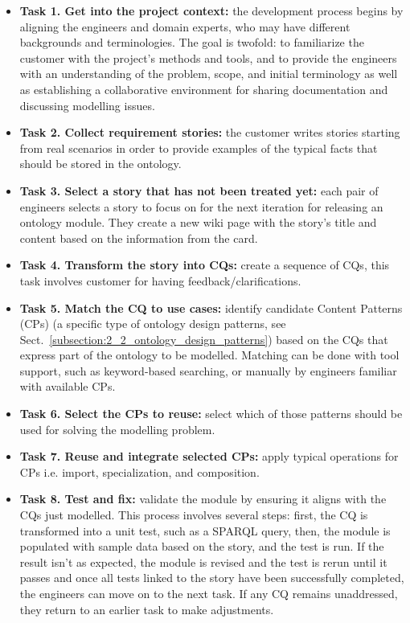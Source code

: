 \begin{itemize}
    \item \textbf{Task 1. Get into the project context:} the development process begins by aligning the engineers and domain experts, who may have different backgrounds and terminologies. The goal is twofold: to familiarize the customer with the project's methods and tools, and to provide the engineers with an understanding of the problem, scope, and initial terminology as well as establishing a collaborative environment for sharing documentation and discussing modelling issues.

    \item \textbf{Task 2. Collect requirement stories:} the customer writes stories starting from real scenarios in order to provide examples of the typical facts that should be stored in the ontology.

    \item \textbf{Task 3. Select a story that has not been treated yet:} each pair of engineers selects a story to focus on for the next iteration for releasing an ontology module. They create a new wiki page with the story's title and content based on the information from the card.

    \item \textbf{Task 4. Transform the story into CQs:} create a sequence of CQs, this task involves customer for having feedback/clarifications.

    \item \textbf{Task 5. Match the CQ to use cases:} identify candidate Content Patterns (CPs) (a specific type of ontology design patterns, see Sect.~\ref{subsection:2_2_ontology_design_patterns}) based on the CQs that express part of the ontology to be modelled. Matching can be done with tool support, such as keyword-based searching, or manually by engineers familiar with available CPs.

    \item \textbf{Task 6. Select the CPs to reuse:} select which of those patterns should be used for solving the modelling problem.

    \item \textbf{Task 7. Reuse and integrate selected CPs:} apply typical operations for CPs i.e. import, specialization, and composition. 

    \item \textbf{Task 8. Test and fix:} validate the module by ensuring it aligns with the CQs just modelled. This process involves several steps: first, the CQ is transformed into a unit test, such as a SPARQL query, then, the module is populated with sample data based on the story, and the test is run. If the result isn't as expected, the module is revised and the test is rerun until it passes and once all tests linked to the story have been successfully completed, the engineers can move on to the next task. If any CQ remains unaddressed, they return to an earlier task to make adjustments.


\end{itemize}
